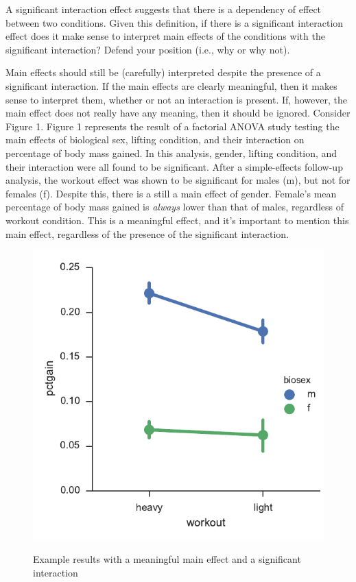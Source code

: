 \documentclass[onecolumn,10pt]{jhwhw}
\begin{document}
\problem{}
A significant interaction effect suggests that there is a dependency of effect between two conditions. Given this definition, if there is a significant interaction effect does it make sense to interpret main effects of the conditions with the significant interaction? Defend your position (i.e., why or why not).

Main effects should still be (carefully) interpreted despite the presence of a significant interaction. If the main effects are clearly meaningful, then it makes sense to interpret them, whether or not an interaction is present. If, however, the main effect does not really have any meaning, then it should be ignored. Consider Figure 1. Figure 1 represents the result of a factorial ANOVA study testing the main effects of biological sex, lifting condition, and their interaction on percentage of body mass gained. In this analysis, gender, lifting condition, and their interaction were all found to be significant. After a simple-effects follow-up analysis, the workout effect was shown to be significant for males (m), but not for females (f). Despite this, there is a still a main effect of gender. Female's mean percentage of body mass gained is \textit{always} lower than that of males, regardless of workout condition. This is a meaningful effect, and it's important to mention this main effect, regardless of the presence of the significant interaction.

\begin{figure}[h!]
\begin{center}
\includegraphics[width=.35\textheight]{p5.pdf}
\label{fig:on}
\end{center}
\caption{Example results with a meaningful main effect and a significant interaction}
\end{figure}
\end{document}
